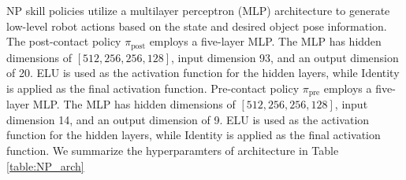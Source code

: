 NP skill policies utilize a multilayer perceptron (MLP) architecture to generate low-level robot actions based on the state and desired object pose information. The post-contact policy $\pi_\text{post}$ employs a five-layer MLP. The MLP has hidden dimensions of $[512, 256, 256, 128]$, input dimension 93, and an output dimension of 20. ELU is used as the activation function for the hidden layers, while Identity is applied as the final activation function. Pre-contact policy $\pi_\text{pre}$ employs a five-layer MLP. The MLP has hidden dimensions of $[512, 256, 256, 128]$, input dimension 14, and an output dimension of 9. ELU is used as the activation function for the hidden layers, while Identity is applied as the final activation function. We summarize the hyperparamters of architecture in Table \ref{table:NP_arch}

